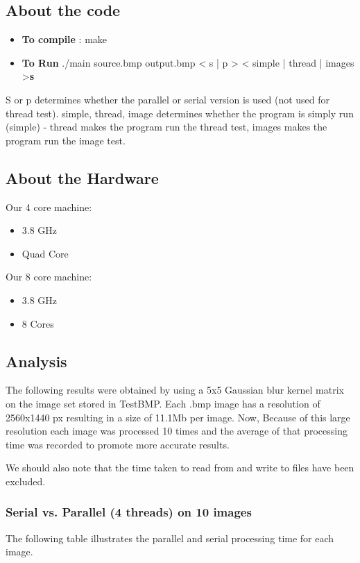 \documentclass[paper=a4, fontsize=11pt]{scrartcl} %
\numberwithin{equation}{section} %
\numberwithin{figure}{section} %
\numberwithin{table}{section} %
\begin{document}
\subsection{About the code}
\begin{itemize}

\item \textbf{To compile}  : make
\item \textbf{To Run}
	\subitem ./main source.bmp output.bmp < s | p > < simple | thread | images >\textbf{s}  
\end{itemize}
S or p determines whether the parallel or serial version is used (not used for thread test). simple, thread, image determines whether the program is simply run (simple) - thread makes the program run the thread test, images makes the program run the image test.


\subsection{About the Hardware}

Our 4 core machine:
\begin{itemize}
\item{3.8 GHz}
\item{Quad Core}
\end{itemize}

Our 8 core machine:
\begin{itemize}
\item{3.8 GHz}
\item{8 Cores}
\end{itemize}

\subsection{Analysis}
The following results were obtained by using a 5x5 Gaussian blur kernel matrix on the image set stored in TestBMP.
Each .bmp image has a resolution of 2560x1440 px resulting in a size of 11.1Mb per image. Now, Because of this large resolution each image was processed 10 times and the average of that processing time was recorded to promote more accurate results.


We should also note that the time taken to read from and write to files have been excluded.


\subsubsection{Serial vs. Parallel (4 threads) on 10 images}
The following table illustrates the parallel and serial processing time for each image.
\end{document}

